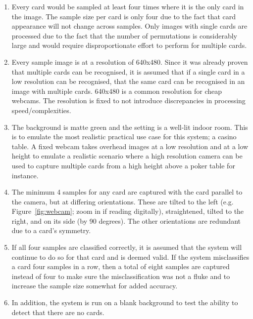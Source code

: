 \documentclass[a4paper,12pt,notitlepage]{article}
\begin{document}
	\begin{enumerate}
		\item Every card would be sampled at least four times where it is the only card in the image. The sample size per card is only four due to the fact that card appearance will not change across samples. Only images with single cards are processed due to the fact that the number of permutations is considerably large and would require disproportionate effort to perform for multiple cards.
		\item Every sample image is at a resolution of 640x480. Since it was already proven that multiple cards can be recognised, it is assumed that if a single card in a low resolution can be recognised, that the same card can be recognised in an image with multiple cards. 640x480 is a common resolution for cheap webcams. The resolution is fixed to not introduce discrepancies in processing speed/complexities.
		\item The background is matte green and the setting is a well-lit indoor room. This is to emulate the most realistic practical use case for this system; a casino table. A fixed webcam takes overhead images at a low resolution and at a low height to emulate a realistic scenario where a high resolution camera can be used to capture multiple cards from a high height above a poker table for instance.
		\item The minimum 4 samples for any card are captured with the card parallel to the camera, but at differing orientations. These are tilted to the left (e.g. Figure~\ref{fig:webcam}; zoom in if reading digitally), straightened, tilted to the right, and on its side (by 90 degrees). The other orientations are redundant due to a card's symmetry.
		\item If all four samples are classified correctly, it is assumed that the system will continue to do so for that card and is deemed valid. If the system misclassifies a card four samples in a row, then a total of eight samples are captured instead of four to make sure the misclassification was not a fluke and to increase the sample size somewhat for added accuracy.
		\item In addition, the system is run on a blank background to test the ability to detect that there are no cards.
	\end{enumerate}
\end{document}

